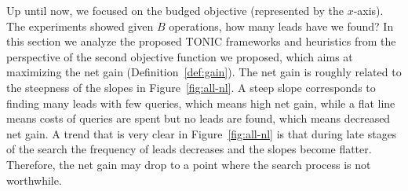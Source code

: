 \documentclass[prodmode,acmtecs]{acmsmall} %
\begin{document}
Up until now, we focused on the budged objective (represented by the $x$-axis). The experiments showed given $B$ operations, how many leads have we found?
In this section we analyze the proposed TONIC frameworks and heuristics from the perspective of the second objective function we proposed, which aims at maximizing the net gain (Definition~\ref{def:gain}). 
The net gain is roughly related to the steepness of the slopes in Figure~\ref{fig:all-nl}. A steep slope corresponds to finding many leads with few queries, which means high net gain, while a flat line means costs of queries are spent but no leads are found, which means decreased net gain. A trend that is very clear in Figure~\ref{fig:all-nl} is that during late stages of the search the frequency of leads decreases and the slopes become flatter. Therefore, the net gain may drop to a point where the search process is not worthwhile.
\end{document}
